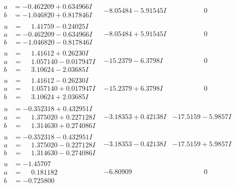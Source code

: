 \documentclass[1p]{elsarticle_modified}
\theoremstyle{definition}
\begin{document}
$$\begin{array}{c|c|c}
\begin{aligned}
a &= -0.462209 + 0.634966 I \\
b &= -1.046820 + 0.817846 I\end{aligned}
 & -8.05484 - 5.91545 I & \phantom{-0.000000 } 0 \\ \hline\begin{aligned}
u &= \phantom{-}1.41759 - 0.24025 I \\
a &= -0.462209 - 0.634966 I \\
b &= -1.046820 - 0.817846 I\end{aligned}
 & -8.05484 + 5.91545 I & \phantom{-0.000000 } 0 \\ \hline\begin{aligned}
u &= \phantom{-}1.41612 + 0.26230 I \\
a &= \phantom{-}1.057140 - 0.017947 I \\
b &= \phantom{-}3.10624 - 2.03685 I\end{aligned}
 & -15.2379 - 6.3798 I & \phantom{-0.000000 } 0 \\ \hline\begin{aligned}
u &= \phantom{-}1.41612 - 0.26230 I \\
a &= \phantom{-}1.057140 + 0.017947 I \\
b &= \phantom{-}3.10624 + 2.03685 I\end{aligned}
 & -15.2379 + 6.3798 I & \phantom{-0.000000 } 0 \\ \hline\begin{aligned}
u &= -0.352318 + 0.432951 I \\
a &= \phantom{-}1.375020 + 0.227128 I \\
b &= \phantom{-}1.314630 + 0.274086 I\end{aligned}
 & -3.18353 + 0.42138 I & -17.5159 - 5.9857 I \\ \hline\begin{aligned}
u &= -0.352318 - 0.432951 I \\
a &= \phantom{-}1.375020 - 0.227128 I \\
b &= \phantom{-}1.314630 - 0.274086 I\end{aligned}
 & -3.18353 - 0.42138 I & -17.5159 + 5.9857 I \\ \hline\begin{aligned}
u &= -1.45707\phantom{ +0.000000I} \\
a &= \phantom{-}0.181182\phantom{ +0.000000I} \\
b &= -0.725800\phantom{ +0.000000I}\end{aligned}
 & -6.80909\phantom{ +0.000000I} & \phantom{-0.000000 } 0\\

\end{array}$$
\end{document}
